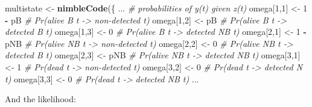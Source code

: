 \documentclass[
  12pt,
]{krantz}
\newenvironment{Shaded}{\begin{snugshade}}{\end{snugshade}}
\newcommand{\CommentTok}[1]{\textcolor[rgb]{0.56,0.35,0.01}{\textit{#1}}}
\newcommand{\DecValTok}[1]{\textcolor[rgb]{0.00,0.00,0.81}{#1}}
\newcommand{\FunctionTok}[1]{\textcolor[rgb]{0.13,0.29,0.53}{\textbf{#1}}}
\newcommand{\NormalTok}[1]{#1}
\newcommand{\OtherTok}[1]{\textcolor[rgb]{0.56,0.35,0.01}{#1}}
\newcommand{\SpecialCharTok}[1]{\textcolor[rgb]{0.81,0.36,0.00}{\textbf{#1}}}
\begin{document}
\begin{Shaded}
\begin{Highlighting}[]
\NormalTok{multistate }\OtherTok{\textless{}{-}} \FunctionTok{nimbleCode}\NormalTok{(\{}
\NormalTok{...}
  \CommentTok{\# probabilities of y(t) given z(t)}
\NormalTok{  omega[}\DecValTok{1}\NormalTok{,}\DecValTok{1}\NormalTok{] }\OtherTok{\textless{}{-}} \DecValTok{1} \SpecialCharTok{{-}}\NormalTok{ pB    }\CommentTok{\# Pr(alive B t {-}\textgreater{} non{-}detected t)}
\NormalTok{  omega[}\DecValTok{1}\NormalTok{,}\DecValTok{2}\NormalTok{] }\OtherTok{\textless{}{-}}\NormalTok{ pB        }\CommentTok{\# Pr(alive B t {-}\textgreater{} detected B t)}
\NormalTok{  omega[}\DecValTok{1}\NormalTok{,}\DecValTok{3}\NormalTok{] }\OtherTok{\textless{}{-}} \DecValTok{0}         \CommentTok{\# Pr(alive B t {-}\textgreater{} detected NB t)}
\NormalTok{  omega[}\DecValTok{2}\NormalTok{,}\DecValTok{1}\NormalTok{] }\OtherTok{\textless{}{-}} \DecValTok{1} \SpecialCharTok{{-}}\NormalTok{ pNB   }\CommentTok{\# Pr(alive NB t {-}\textgreater{} non{-}detected t)}
\NormalTok{  omega[}\DecValTok{2}\NormalTok{,}\DecValTok{2}\NormalTok{] }\OtherTok{\textless{}{-}} \DecValTok{0}         \CommentTok{\# Pr(alive NB t {-}\textgreater{} detected B t)}
\NormalTok{  omega[}\DecValTok{2}\NormalTok{,}\DecValTok{3}\NormalTok{] }\OtherTok{\textless{}{-}}\NormalTok{ pNB       }\CommentTok{\# Pr(alive NB t {-}\textgreater{} detected NB t)}
\NormalTok{  omega[}\DecValTok{3}\NormalTok{,}\DecValTok{1}\NormalTok{] }\OtherTok{\textless{}{-}} \DecValTok{1}         \CommentTok{\# Pr(dead t {-}\textgreater{} non{-}detected t)}
\NormalTok{  omega[}\DecValTok{3}\NormalTok{,}\DecValTok{2}\NormalTok{] }\OtherTok{\textless{}{-}} \DecValTok{0}         \CommentTok{\# Pr(dead t {-}\textgreater{} detected N t)}
\NormalTok{  omega[}\DecValTok{3}\NormalTok{,}\DecValTok{3}\NormalTok{] }\OtherTok{\textless{}{-}} \DecValTok{0}         \CommentTok{\# Pr(dead t {-}\textgreater{} detected NB t)}
\NormalTok{...}
\end{Highlighting}
\end{Shaded}

And the likelihood:
\end{document}
